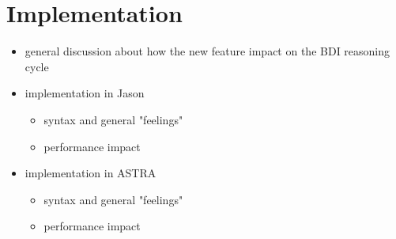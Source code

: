 \section{Implementation}
\label{sec:evaluation}

\begin{itemize}
\item general discussion about how the new feature impact on the BDI reasoning cycle
\item implementation in Jason
\begin{itemize}
\item syntax and general "feelings"
\item performance impact
\end{itemize}
\item implementation in ASTRA
\begin{itemize}
\item syntax and general "feelings"
\item {performance impact}
\end{itemize}
\end{itemize}

